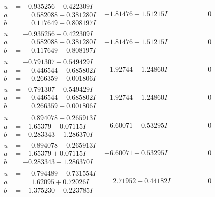 \documentclass[1p]{elsarticle_modified}
\theoremstyle{definition}
\begin{document}
$$\begin{array}{c|c|c}
\begin{aligned}
u &= -0.935256 + 0.422309 I \\
a &= \phantom{-}0.582088 - 0.381280 I \\
b &= \phantom{-}0.117649 - 0.808197 I\end{aligned}
 & -1.81476 + 1.51215 I & \phantom{-0.000000 } 0 \\ \hline\begin{aligned}
u &= -0.935256 - 0.422309 I \\
a &= \phantom{-}0.582088 + 0.381280 I \\
b &= \phantom{-}0.117649 + 0.808197 I\end{aligned}
 & -1.81476 - 1.51215 I & \phantom{-0.000000 } 0 \\ \hline\begin{aligned}
u &= -0.791307 + 0.549429 I \\
a &= \phantom{-}0.446544 - 0.685802 I \\
b &= \phantom{-}0.266359 - 0.001806 I\end{aligned}
 & -1.92744 + 1.24860 I & \phantom{-0.000000 } 0 \\ \hline\begin{aligned}
u &= -0.791307 - 0.549429 I \\
a &= \phantom{-}0.446544 + 0.685802 I \\
b &= \phantom{-}0.266359 + 0.001806 I\end{aligned}
 & -1.92744 - 1.24860 I & \phantom{-0.000000 } 0 \\ \hline\begin{aligned}
u &= \phantom{-}0.894078 + 0.265913 I \\
a &= -1.65379 - 0.07115 I \\
b &= -0.283343 - 1.286370 I\end{aligned}
 & -6.60071 - 0.53295 I & \phantom{-0.000000 } 0 \\ \hline\begin{aligned}
u &= \phantom{-}0.894078 - 0.265913 I \\
a &= -1.65379 + 0.07115 I \\
b &= -0.283343 + 1.286370 I\end{aligned}
 & -6.60071 + 0.53295 I & \phantom{-0.000000 } 0 \\ \hline\begin{aligned}
u &= \phantom{-}0.794489 + 0.731554 I \\
a &= \phantom{-}1.62095 + 0.72026 I \\
b &= -1.375230 - 0.223785 I\end{aligned}
 & \phantom{-}2.71952 - 0.44182 I & \phantom{-0.000000 } 0 \\ \hline\begin{aligned}

\end{aligned}
\end{array}$$
\end{document}
